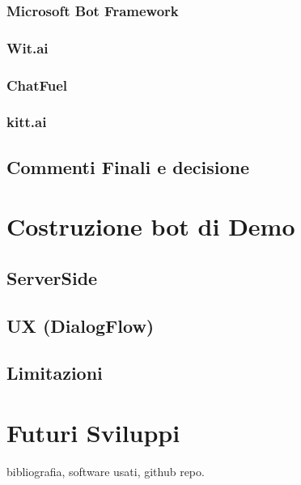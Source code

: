 \documentclass[]{article}
\begin{document}
\subsubsection{Microsoft Bot Framework}
\subsubsection{Wit.ai}
\subsubsection{ChatFuel}
\subsubsection{kitt.ai}
\subsection{Commenti Finali e decisione}

\section{Costruzione bot di Demo}
\subsection{ServerSide}
\subsection{UX (DialogFlow)}
\subsection{Limitazioni}

\section{Futuri Sviluppi}

\begin{thebibliography}{9}
bibliografia, software usati, github repo.
\end{thebibliography}
\end{document}
